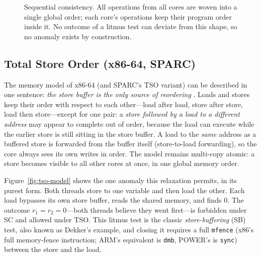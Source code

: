 \begin{figure}[htbp]
\centering
{}
\caption{Sequential consistency. All operations from all cores are woven
into a single global order; each core's operations keep their program
order inside it. No outcome of a litmus test can deviate from this shape,
so no anomaly exists by construction.}
\label{fig:sc-model}
\end{figure}

\subsection{Total Store Order (x86-64, SPARC)}
\label{sec:tso-model}

The memory model of x86-64 (and SPARC's TSO variant) can be described in
one sentence: \emph{the store buffer is the only source of reordering}
\cite{sewell10cacm,adve96tutorial}. Loads and stores keep their order with
respect to each other---load after load, store after store, load then
store---except for one pair: a \emph{store followed by a load to a
different address} may appear to complete out of order, because the load
can execute while the earlier store is still sitting in the store buffer.
A load to the \emph{same} address as a buffered store is forwarded from
the buffer itself (store-to-load forwarding), so the core always sees its
own writes in order. The model remains multi-copy atomic: a store becomes
visible to all other cores at once, in one global memory order.

Figure~\ref{fig:tso-model} shows the one anomaly this relaxation permits,
in its purest form. Both threads store to one variable and then load the
other. Each load bypasses its own store buffer, reads the shared memory,
and finds $0$. The outcome $r_1{=}r_2{=}0$---both threads believe they went
first---is forbidden under SC and allowed under TSO. This litmus test is
the classic \emph{store-buffering} (SB) test, also known as Dekker's
example, and closing it requires a full \texttt{mfence} (x86's full
memory-fence instruction; ARM's equivalent is \texttt{dmb}, POWER's is
\texttt{sync}) between the store
and the load.

